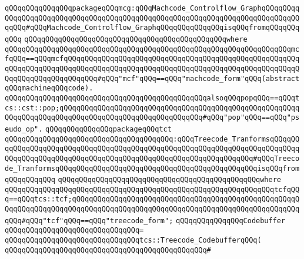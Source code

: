 \newline
\verb|qQQqqQQqqQQqqQQqpackageqQQqmcg:qQQqMachcode_Controlflow_GraphqQQqqQQqqQQqqQQqqQQqqQQqqQQqqQQqqQQqqQQqqQQqqQQqqQQqqQQqqQQqqQQqqQQqqQQqqQQqqQQqqQQq#qQQqMachcode_Controlflow_GraphqQQqqQQqqQQqqQQqisqQQqfromqQQqqQQqqQQq|\newline
\verb|qQQqqQQqqQQqqQQqqQQqqQQqqQQqqQQqqQQqqQQqqQQqqQQqwhere|\newline
\verb|qQQqqQQqqQQqqQQqqQQqqQQqqQQqqQQqqQQqqQQqqQQqqQQqqQQqqQQqqQQqqQQqqQQqmcfqQQq==qQQqmcfqQQqqQQqqQQqqQQqqQQqqQQqqQQqqQQqqQQqqQQqqQQqqQQqqQQqqQQqqQQqqQQqqQQqqQQqqQQqqQQqqQQqqQQqqQQqqQQqqQQqqQQqqQQqqQQqqQQqqQQqqQQqqQQqqQQqqQQqqQQqqQQqqQQq#qQQq"mcf"qQQq==qQQq"machcode_form"qQQq(abstractqQQqmachineqQQqcode).|\newline
\verb|qQQqqQQqqQQqqQQqqQQqqQQqqQQqqQQqqQQqqQQqqQQqqQQqalsoqQQqpopqQQq==qQQqtcs::cst::pop;qQQqqQQqqQQqqQQqqQQqqQQqqQQqqQQqqQQqqQQqqQQqqQQqqQQqqQQqqQQqqQQqqQQqqQQqqQQqqQQqqQQqqQQqqQQqqQQqqQQqqQQq#qQQq"pop"qQQq==qQQq"pseudo_op".|\newline
\newline
\verb|qQQqqQQqqQQqqQQqpackageqQQqtct|\newline
\verb|qQQqqQQqqQQqqQQqqQQqqQQqqQQqqQQqqQQqqQQq:qQQqTreecode_TranformsqQQqqQQqqQQqqQQqqQQqqQQqqQQqqQQqqQQqqQQqqQQqqQQqqQQqqQQqqQQqqQQqqQQqqQQqqQQqqQQqqQQqqQQqqQQqqQQqqQQqqQQqqQQqqQQqqQQqqQQqqQQqqQQqqQQqqQQq#qQQqTreecode_TranformsqQQqqQQqqQQqqQQqqQQqqQQqqQQqqQQqqQQqqQQqqQQqqQQqisqQQqfromqQQqqQQqqQQq|\newline
\verb|qQQqqQQqqQQqqQQqqQQqqQQqqQQqqQQqqQQqqQQqqQQqqQQqwhere|\newline
\verb|qQQqqQQqqQQqqQQqqQQqqQQqqQQqqQQqqQQqqQQqqQQqqQQqqQQqqQQqqQQqqQQqtcfqQQq==qQQqtcs::tcf;qQQqqQQqqQQqqQQqqQQqqQQqqQQqqQQqqQQqqQQqqQQqqQQqqQQqqQQqqQQqqQQqqQQqqQQqqQQqqQQqqQQqqQQqqQQqqQQqqQQqqQQqqQQqqQQqqQQqqQQqqQQqqQQq#qQQq"tcf"qQQq==qQQq"treecode_form";|\newline
\newline
\verb|qQQqqQQqqQQqqQQqCodebuffer|\newline
\verb|qQQqqQQqqQQqqQQqqQQqqQQqqQQqqQQq=|\newline
\verb|qQQqqQQqqQQqqQQqqQQqqQQqqQQqqQQqtcs::Treecode_CodebufferqQQq(|\newline
\verb|qQQqqQQqqQQqqQQqqQQqqQQqqQQqqQQqqQQqqQQqqQQqqQQq#|\newline

